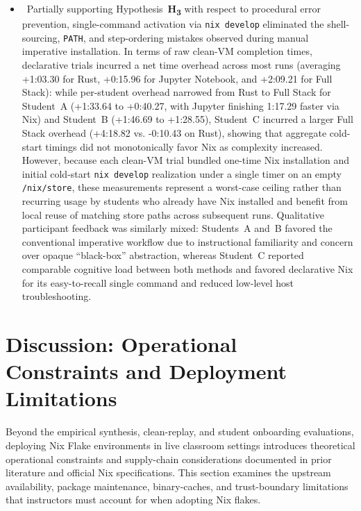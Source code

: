 \begin{itemize}
    \item \rqthreetitle\ Partially supporting Hypothesis~\textbf{H\textsubscript{3}}
        with respect to procedural error prevention, single-command activation via
        \texttt{nix develop} eliminated the shell-sourcing, \texttt{PATH}, and step-ordering
        mistakes observed during manual imperative installation. In terms of raw
        clean-VM completion times, declarative trials incurred a net time overhead
        across most runs (averaging +1:03.30 for Rust, +0:15.96 for Jupyter Notebook,
        and +2:09.21 for Full Stack): while per-student overhead narrowed from Rust
        to Full Stack for Student~A (+1:33.64 to +0:40.27, with Jupyter finishing
        1:17.29 faster via Nix) and Student~B (+1:46.69 to +1:28.55), Student~C incurred
        a larger Full Stack overhead (+4:18.82 vs. -0:10.43 on Rust), showing that
        aggregate cold-start timings did not monotonically favor Nix as complexity
        increased. However, because each clean-VM trial bundled one-time Nix installation
        and initial cold-start \texttt{nix develop} realization under a single
        timer on an empty \texttt{/nix/store}, these measurements represent a
        worst-case ceiling rather than recurring usage by students who already
        have Nix installed and benefit from local reuse of matching store paths
        across subsequent runs. Qualitative participant feedback was similarly mixed:
        Students~A and~B favored the conventional imperative workflow due to
        instructional familiarity and concern over opaque ``black-box''
        abstraction, whereas Student~C reported comparable cognitive load between
        both methods and favored declarative Nix for its easy-to-recall single command
        and reduced low-level host troubleshooting.
\end{itemize}

\section{Discussion: Operational Constraints and Deployment Limitations}
\label{sec:operational-constraints}

Beyond the empirical synthesis, clean-replay, and student onboarding evaluations,
deploying Nix Flake environments in live classroom settings introduces
theoretical operational constraints and supply-chain considerations documented
in prior literature and official Nix specifications. This section examines the upstream
availability, package maintenance, binary-caches, and trust-boundary limitations
that instructors must account for when adopting Nix flakes.

